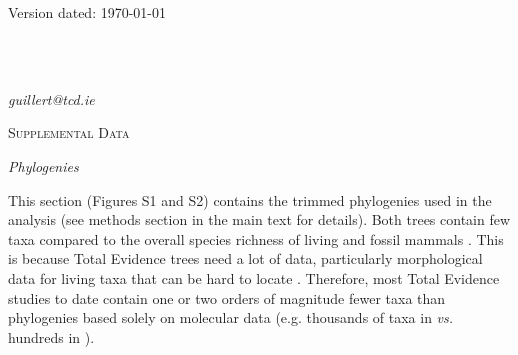 \documentclass[12pt,letterpaper]{article}
\renewcommand{\section}[1]{%
\bigskip
\begin{center}
\begin{Large}
\normalfont\scshape #1
\medskip
\end{Large}
\end{center}}
\renewcommand{\subsection}[1]{%
\bigskip
\begin{center}
\begin{large}
\normalfont\itshape #1
\end{large}
\end{center}}
\begin{document}
\begin{flushright}
Version dated: \today
\end{flushright}
\bigskip
\bigskip
\medskip
\begin{center}

\bigskip 

\\
\\
\end{center}
\medskip
{} \textit{guillert@tcd.ie}\\  
\vspace{1in}



\modulolinenumbers[1]
\linenumbers

\renewcommand\thefigure{S\arabic{figure}}
\renewcommand\thetable{S\arabic{table}}
\makeatletter
\renewcommand\@biblabel[1]{[S#1]}
\renewcommand\@cite[1]{[S#1]}
\makeatother


\section{Supplemental Data}

\subsection{Phylogenies}
This section (Figures S1 and S2) contains the trimmed phylogenies used in the analysis (see methods section in the main text for details).
Both trees contain few taxa compared to the overall species richness of living and fossil mammals \cite{bininda2007delayed,archibald2011extinction}.
This is because Total Evidence trees need a lot of data, particularly morphological data for living taxa that can be hard to locate \cite{GuillermeCooper}.
Therefore, most Total Evidence studies to date contain one or two orders of magnitude fewer taxa than phylogenies based solely on molecular data (e.g. thousands of taxa in \cite{bininda2007delayed,meredithimpacts2011} \textit{vs.} hundreds in \cite{ronquista2012,Slater2012MEE,beckancient2014}).
\end{document}
